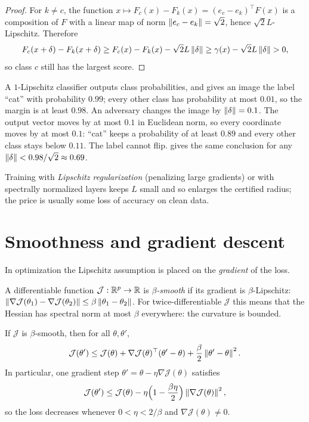 \begin{notechapter}
\begin{proof}
For $k\neq c$, the function $x\mapsto F_c(x) - F_k(x) = (e_c - e_k)^\top F(x)$
is a composition of $F$ with a linear map of norm $\left\|e_c - e_k\right\| = \sqrt2$,
hence $\sqrt2L$-Lipschitz. Therefore
\[
  F_c(x+\delta) - F_k(x+\delta)\geq F_c(x) - F_k(x) - \sqrt2L\left\|\delta\right\|
  \geq\gamma(x) - \sqrt2L\left\|\delta\right\| > 0,
\]
so class $c$ still has the largest score.
\end{proof}

\begin{example}
A $1$-Lipschitz classifier outputs class probabilities, and gives an image the
label ``cat'' with probability $0.99$; every other class has probability at
most $0.01$, so the margin is at least $0.98$. An adversary changes the image
by $\left\|\delta\right\| = 0.1$. The output vector moves by at most $0.1$ in Euclidean
norm, so every coordinate moves by at most $0.1$: ``cat'' keeps a probability of
at least $0.89$ and every other class stays below $0.11$. The label cannot flip.
 gives the same conclusion for any
$\left\|\delta\right\| < 0.98/\sqrt2\approx0.69$.
\end{example}

Training with \emph{Lipschitz regularization} (penalizing large gradients) or
with spectrally normalized layers keeps $L$ small and so enlarges the certified
radius; the price is usually some loss of accuracy on clean data.

\section{Smoothness and gradient descent}\label{lipschitz-continuity:sec:optimization}

In optimization the Lipschitz assumption is placed on the \emph{gradient} of the
loss.

\begin{definition}[Smoothness]
A differentiable function $\mathcal J:\mathbb{R}^p\to\mathbb{R}$ is \emph{$\beta$-smooth} if its
gradient is $\beta$-Lipschitz:
$\left\|\nabla\mathcal J(\theta_1) - \nabla\mathcal J(\theta_2)\right\|\leq\beta\left\|\theta_1-\theta_2\right\|$.
For twice-differentiable $\mathcal J$ this means that the Hessian has spectral
norm at most $\beta$ everywhere: the curvature is bounded.
\end{definition}

\begin{lemma}\label{lipschitz-continuity:lem:descent}
If $\mathcal J$ is $\beta$-smooth, then for all $\theta,\theta'$,
\[
  \mathcal J(\theta')\leq\mathcal J(\theta) + \nabla\mathcal J(\theta)^\top(\theta'-\theta) + \frac\beta2\left\|\theta'-\theta\right\|^2 .
\]
In particular, one gradient step $\theta' = \theta - \eta\nabla\mathcal J(\theta)$
satisfies
\[
  \mathcal J(\theta')\leq\mathcal J(\theta) - \eta\Bigl(1 - \frac{\beta\eta}{2}\Bigr)\left\|\nabla\mathcal J(\theta)\right\|^2,
\]
so the loss decreases whenever $0<\eta<2/\beta$ and $\nabla\mathcal J(\theta)\neq0$.
\end{lemma}


\end{notechapter}
